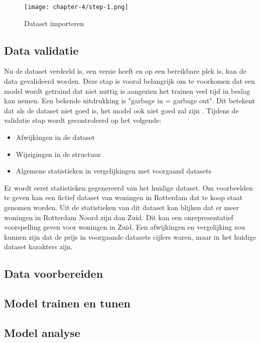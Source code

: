 \begin{figure}[hbt!]
  \centering
  \texttt{[image: chapter-4/step-1.png]}
  \caption{Dataset importeren}
  \label{fig:step-1}
\end{figure}

\subsection{Data validatie}\label{subsec:data-validatie}
Nu de dataset verdeeld is, een versie heeft en op een bereikbare plek is, kan de data gevalideerd worden. Deze stap is vooral belangrijk om te voorkomen dat een model wordt getraind dat niet nuttig is aangezien het trainen veel tijd in beslag kan nemen. Een bekende uitdrukking is "garbage in = garbage out". Dit betekent dat als de dataset niet goed is, het model ook niet goed zal zijn \cite[p.~43]{building-machine-learning-pipelines-oreilly}. Tijdens de validatie stap wordt gecontroleerd op het volgende:

\begin{itemize}
  \item Afwijkingen in de dataset
  \item Wijzigingen in de structuur
  \item Algemene statistieken in vergelijkingen met voorgaand datasets \cite[p.~44]{building-machine-learning-pipelines-oreilly}
\end{itemize}

Er wordt eerst statistieken gegenereerd van het huidige dataset. Om voorbeelden te geven kan een fictief dataset van woningen in Rotterdam dat te koop staat genomen worden. Uit de statistieken van dit dataset kan blijken dat er meer woningen in Rotterdam Noord zijn dan Zuid. Dit kan een onrepresentatief voorspelling geven voor woningen in Zuid. Een afwijkingen en vergelijking zou kunnen zijn dat de prijs in voorgaande datasets cijfers waren, maar in het huidige dataset karakters zijn.

\subsection{Data voorbereiden}\label{subsec:data-voorbereiden}


\subsection{Model trainen en tunen}\label{subsec:model-trainen-en-tunen}


\subsection{Model analyse}\label{subsec:model-analyse}


